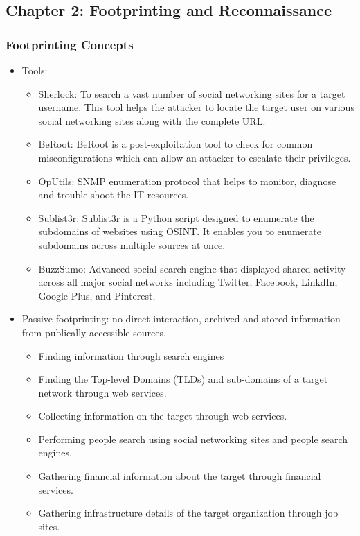 \subsection{Chapter 2: Footprinting and Reconnaissance}
\subsubsection{Footprinting Concepts}
\begin{itemize}
    \item Tools:
    \begin{itemize}
        \item Sherlock: To search a vast number of social networking sites for a target username. This tool helps the attacker to locate the target user on various social networking sites along with the complete URL.
        \item BeRoot: BeRoot is a post-exploitation tool to check for common misconfigurations which can allow an attacker to escalate their privileges.
        \item OpUtils: SNMP enumeration protocol that helps to monitor, diagnose and trouble shoot the IT resources.
        \item Sublist3r: Sublist3r is a Python script designed to enumerate the subdomains of websites using OSINT. It enables you to enumerate subdomains across multiple sources at once.
        \item BuzzSumo: Advanced social search engine that displayed shared activity across all major social networks including Twitter, Facebook, LinkdIn, Google Plus, and Pinterest.
    \end{itemize}
    \item Passive footprinting: no direct interaction, archived and stored information from publically accessible sources.
    \begin{itemize}
        \item Finding information through search engines
        \item Finding the Top-level Domains (TLDs) and sub-domains of a target network through web services.
        \item Collecting information on the target through web services.
        \item Performing people search using social networking sites and people search engines.
        \item Gathering financial information about the target through financial services.
        \item Gathering infrastructure details of the target organization through job sites.

\end{itemize}
\end{itemize}
